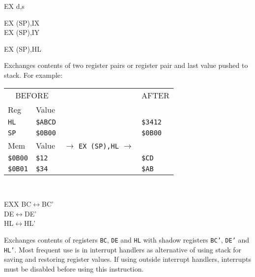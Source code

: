 \documentclass[12pt,twoside,openright,a4paper]{book}
\begin{document}
\begin{basedescript}{
	\desclabelstyle{\multilinelabel}
	\desclabelwidth{3cm}}
\begin{detailitem}{EX d,s}
\begin{DetailVariants}
			\columnbreak
			EX (SP),IX\\
			EX (SP),IY
			
			\columnbreak
			EX (SP),HL
		\end{DetailVariants}

		Exchanges contents of two register pairs or register pair and last value pushed to stack. For example:

		\begin{tabular}{llcl}
			\multicolumn{2}{c}{BEFORE} & & AFTER \\[5pt]
			Reg & \multicolumn{3}{l}{Value} \\[5pt]
			{\tt HL} & 
				{\tt \$ABCD} & 
				\multirow{5}{*}{$\rightarrow$ {\tt EX (SP),HL} $\rightarrow$} & 
				{\tt \$3412}\\
			{\tt SP} & {\tt \$0B00} & & {\tt \$0B00}\\[5pt]
			Mem & Value \\[5pt]
			{\tt \$0B00} & {\tt \$12} & & {\tt \$CD}\\
			{\tt \$0B01} & {\tt \$34} & & {\tt \$AB}\\
		\end{tabular}\\[5pt] %

		\DetailNoEffect
						
		\begin{DetailTiming}
		\end{DetailTiming}

	\end{detailitem}

	\pagebreak
	\begin{detailitem}{EXX}
		{BC$\leftrightarrow$BC'\\
		DE$\leftrightarrow$DE'\\
		HL$\leftrightarrow$HL'}

		Exchanges contents of registers {\tt BC}, {\tt DE} and {\tt HL} with shadow registers {\tt BC'}, {\tt DE'} and {\tt HL'}. Most frequent use is in interrupt handlers as alternative of using stack for saving and restoring register values. If using outside interrupt handlers, interrupts must be disabled before using this instruction.

		\DetailNoEffect
				
		\begin{DetailTiming}
			\DetailTime{}{1}{4}
		\end{DetailTiming}


\end{detailitem}
\end{basedescript}
\end{document}

